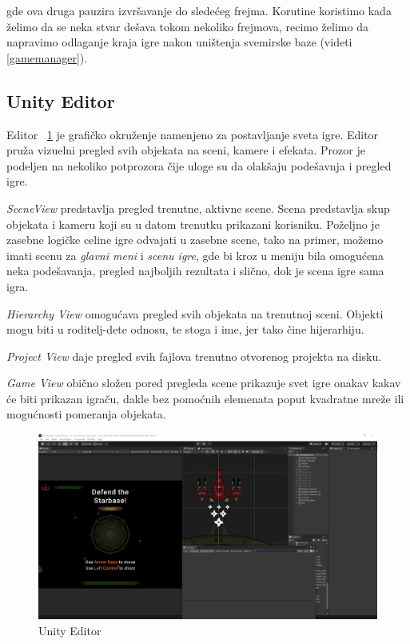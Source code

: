 gde ova druga pauzira izvr\v{s}avanje do slede\'ceg frejma. Korutine koristimo kada \v{z}elimo da se
neka stvar de\v{s}ava tokom nekoliko frejmova, recimo \v{z}elimo da napravimo odlaganje kraja igre nakon
uni\v{s}tenja svemirske baze (videti \ref{gamemanager}).

\subsection{Unity Editor}

Editor ~\ref{fig:unityeditor} je grafi\v{c}ko okru\v{z}enje namenjeno za postavljanje sveta igre. Editor
pru\v{z}a vizuelni pregled svih objekata na sceni, kamere i efekata. Prozor je podeljen
na nekoliko potprozora \v{c}ije uloge su da olak\v{s}aju pode\v{s}avnja i pregled igre.

\emph{SceneView} predstavlja pregled trenutne, aktivne scene. Scena predstavlja skup
objekata i kameru koji su u datom trenutku prikazani korisniku. Po\v{z}eljno je zasebne
logi\v{c}ke celine igre odvajati u zasebne scene, tako na primer, mo\v{z}emo imati scenu
za \emph{glavni meni} i \emph{scenu igre}, gde bi kroz u meniju bila omogu\'cena neka pode\v{s}avanja,
pregled najboljih rezultata i sli\v{c}no, dok je scena igre sama igra.

\emph{Hierarchy View} omogu\'cava pregled svih objekata na trenutnoj sceni. Objekti mogu
biti u roditelj-dete odnosu, te stoga i ime, jer tako \v{c}ine hijerarhiju.

\emph{Project View} daje pregled svih fajlova trenutno otvorenog projekta na disku.

\emph{Game View} obi\v{c}no slo\v{z}en pored pregleda scene prikazuje svet igre
onakav kakav \'ce biti prikazan igra\v{c}u, dakle bez pomo\'cnih elemenata poput 
kvadratne mre\v{z}e ili mogu\'cnosti pomeranja objekata. 

\begin{figure}[ht]
    \centerline{\includegraphics[width=0.9\paperwidth]{Figures/Editor.png}}
    \caption{Unity Editor}
    \label{fig:unityeditor}
\end{figure}

